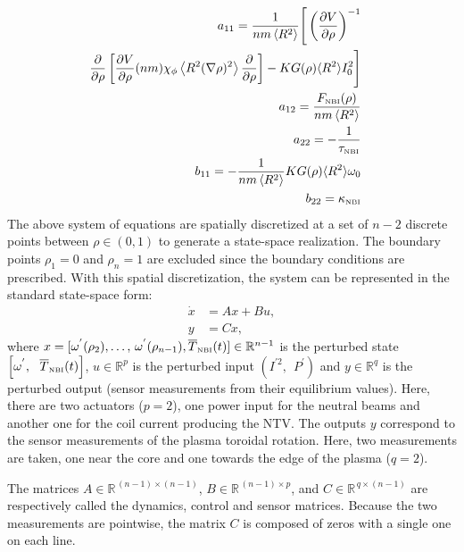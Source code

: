 \documentclass[12pt]{iopart}
\begin{document}
 \begin{eqnarray}
 a_{11} =  \frac{1}{n m \left<R^2\right>} \Bigg[ \left( \frac{\partial V}{\partial\rho}\right)^{-1} \nonumber \\
   \hspace{-1em}\frac{\partial}{\partial \rho} 
   \left[\frac{\partial V}{\partial \rho}(n m)\chi_\phi 
   \left< R^2 (\nabla \rho)^2\right> 
   \frac{\partial}{\partial\rho}\right]-K G(\rho) \langle R^2 \rangle  I^2_0 \Bigg]  \nonumber \\
 a_{12} =  \frac{ F_\textrm{\tiny{NBI}}(\rho) }{n m \left<R^2\right>}\nonumber \\
 a_{22} = - \frac{1}{\tau_\textrm{\tiny{NBI}}}  \nonumber \\  
 b_{11} = - \frac{1}{n m \left<R^2\right>} K G(\rho) \langle R^2 \rangle  \omega_0 \nonumber \\
 b_{22} = \kappa_\textrm{\tiny{NBI}} \nonumber
 \end{eqnarray}
 The above system of equations are spatially discretized at a set of $n-2$ discrete points between $\rho \in (0,1)$ to generate a state-space realization. The boundary points $\rho_1 = 0$ and $\rho_n =1$ are excluded since the boundary conditions are prescribed. With this spatial discretization, the system can be represented in the standard state-space form:
\begin{align}
	\dot{x} &= A x + B u, \label{eqn:state-space1} \\
	y &= C x, \label{eqn:state-space2} 
\end{align}
where $x = [  \omega^{'}(\rho_2),\ldots,\,\omega^{'}(\rho_{n-1}), \overline{T}_\textrm{\tiny{NBI}}(t)     ] \in \mathbb{R}^{n-1}$ is the perturbed state $  \left[ \omega^{'} , \ \ \overline{T}_\textrm{\tiny{NBI}}(t)  \right]$, $u \in \mathbb{R}^p$ is the perturbed input $\left( I^{'2}, \ \  P^{'} \right)$ and $y \in \mathbb{R}^q$ is the perturbed output (sensor measurements from their equilibrium values).
Here, there are two actuators ($p=2$), one power input for the neutral beams and another one for the coil current producing the NTV.
The outputs $y$ correspond to the sensor measurements of the plasma toroidal rotation. Here, two measurements are taken, one near the core and one towards the edge of the plasma ($q=2$).

The matrices $A \in \mathbb{R}^{\, (n-1) \times (n-1)}$, $B \in \mathbb{R}^{\,(n-1) \times p}$, and $C \in \mathbb{R}^{\, q \times (n-1)}$ are respectively called the dynamics, control and sensor matrices.
Because the two measurements are pointwise, the matrix $C$ is composed of zeros with a single one on each line.
\end{document}
